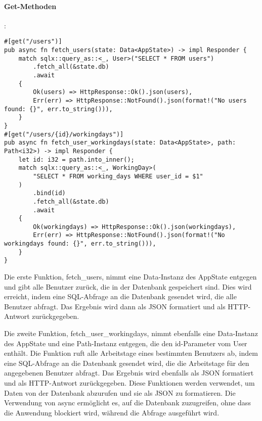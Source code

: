 \paragraph{Get-Methoden}:
\begin{verbatim}
#[get("/users")]
pub async fn fetch_users(state: Data<AppState>) -> impl Responder {
    match sqlx::query_as::<_, User>("SELECT * FROM users")
        .fetch_all(&state.db)
        .await
    {
        Ok(users) => HttpResponse::Ok().json(users),
        Err(err) => HttpResponse::NotFound().json(format!("No users found: {}", err.to_string())),
    }
}
#[get("/users/{id}/workingdays")]
pub async fn fetch_user_workingdays(state: Data<AppState>, path: Path<i32>) -> impl Responder {
    let id: i32 = path.into_inner();
    match sqlx::query_as::<_, WorkingDay>(
        "SELECT * FROM working_days WHERE user_id = $1"
    )
        .bind(id)
        .fetch_all(&state.db)
        .await
    {
        Ok(workingdays) => HttpResponse::Ok().json(workingdays),
        Err(err) => HttpResponse::NotFound().json(format!("No workingdays found: {}", err.to_string())),  
    }
}
\end{verbatim}
Die erste Funktion, fetch\_users, nimmt eine Data-Instanz des AppState entgegen und gibt alle Benutzer zurück, die in der Datenbank gespeichert sind. Dies wird erreicht, indem eine SQL-Abfrage an die Datenbank gesendet wird, die alle Benutzer abfragt. Das Ergebnis wird dann als JSON formatiert und als HTTP-Antwort zurückgegeben.

Die zweite Funktion, fetch\_user\_workingdays, nimmt ebenfalls eine Data-Instanz des AppState und eine Path-Instanz entgegen, die den id-Parameter vom User enthält. Die Funktion ruft alle Arbeitstage eines bestimmten Benutzers ab, indem eine SQL-Abfrage an die Datenbank gesendet wird, die die Arbeitstage für den angegebenen Benutzer abfragt. Das Ergebnis wird ebenfalls als JSON formatiert und als HTTP-Antwort zurückgegeben.
Diese Funktionen werden verwendet, um Daten von der Datenbank abzurufen und sie als JSON zu formatieren. Die Verwendung von async ermöglicht es, auf die Datenbank zuzugreifen, ohne dass die Anwendung blockiert wird, während die Abfrage ausgeführt wird.

